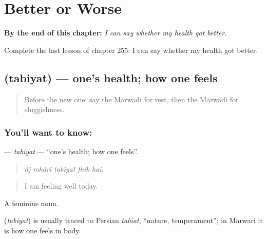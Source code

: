
\chapter{Better or Worse}
\label{ch:mw-better-or-worse}

\begin{chapteropening}
\textbf{By the end of this chapter:} \emph{I can say whether my health got better.}

Complete the last lesson of chapter 255: I can say whether my health got better.
\end{chapteropening}

\section[\texorpdfstring{\mw{तबियत} (tabiyat)}{तबियत (tabiyat)}]{ (tabiyat) — one's health; how one feels}

\label{lesson:MW-C255-tabiyat}



\begin{quote}
Before the new one: say the Marwadi for rest, then the Marwadi for sluggishness.
\end{quote}

\subsection*{You'll want to know: }
\textbf{} — \emph{tabiyat} — \textquotedblleft{}one's health; how one feels\textquotedblright{}.

\begin{quote}
    
\end{quote}

\begin{quote}
\emph{āj mhārī tabiyat ṭhīk hai.}
\end{quote}

\begin{quote}
I am feeling well today.
\end{quote}

A feminine noun.

\begin{cousinweb}
\textbf{} (\emph{tabiyat}) is usually traced to Persian \emph{tabīat}, \textquotedblleft{}nature, temperament\textquotedblright{}; in Marwari it is how one feels in body.
\end{cousinweb}

